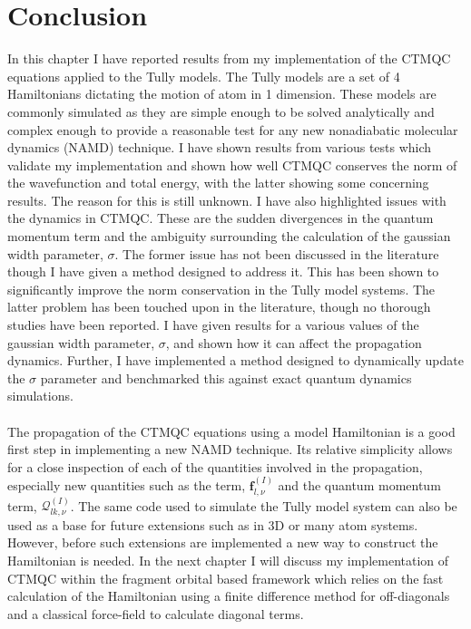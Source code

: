 \section{Conclusion}
In this chapter I have reported results from my implementation of the CTMQC equations applied to the Tully models. The Tully models are a set of 4 Hamiltonians dictating the motion of  atom in 1 dimension. These models are commonly simulated as they are simple enough to be solved analytically and complex enough to provide a reasonable test for any new nonadiabatic molecular dynamics (NAMD) technique. I have shown results from various tests which validate my implementation and shown how well CTMQC conserves the norm of the wavefunction and total energy, with the latter showing some concerning results. The reason for this is still unknown. I have also highlighted  issues with the dynamics in CTMQC. These are the sudden divergences in the quantum momentum term and the ambiguity surrounding the calculation of the gaussian width parameter, $\sigma$. The former issue has not been discussed in the literature  though I have given a method designed to address it. This has been shown to significantly improve the norm conservation in the Tully model systems. The latter problem has been touched upon in the literature, though no thorough studies have been reported. I have given results for a various values of the gaussian width parameter, $\sigma$, and shown how it can affect the propagation dynamics. Further, I have implemented a method designed to dynamically update the $\sigma$ parameter and benchmarked this against exact quantum dynamics simulations.
\\\\
The propagation of the CTMQC equations using a model Hamiltonian is a good first step in implementing a new NAMD technique. Its relative simplicity allows for a close inspection of each of the quantities involved in the propagation, especially new quantities such as the   term, $\mathbf{f}_{l, \nu}^{(I)}$ and the quantum momentum term, $\mathcal{Q}_{lk, \nu}^{(I)}$. The same code used to simulate the Tully model system can also be used as a base for future extensions such as in 3D or many atom systems. However, before such extensions are implemented a new way to construct the Hamiltonian is needed. In the next chapter I will discuss my implementation of CTMQC within the fragment orbital based framework which relies on the fast calculation of the Hamiltonian using a finite difference method for off-diagonals and a classical force-field to calculate diagonal terms. 



